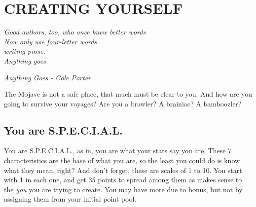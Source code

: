 \documentclass[11pt]{article} %
\begin{document}
\newpage

\section{CREATING YOURSELF}

\epigraph{\textit{Good authors, too, who once knew better words \\
Now only use four-letter words \\
writing prose. \\
Anything goes}}{\textit{Anything Goes - Cole Porter}}

The Mojave is not a safe place, that much must be clear to you. And how are you going to survive your voyages? Are you a brawler? A brainiac? A bamboozler? 

\subsection{You are S.P.E.C.I.A.L.}

You are S.P.E.C.I.A.L., as in, you are what your stats say you are. These 7 characteristics are the base of what you are, so the least you could do is know what they mean, right? And don't forget, these are scales of 1 to 10. You start with 1 in each one, and get 35 points to spread among them as makes sense to the \textit{you} you are trying to create. You may have more due to bonus, but not by assigning them from your initial point pool.
\end{document}
